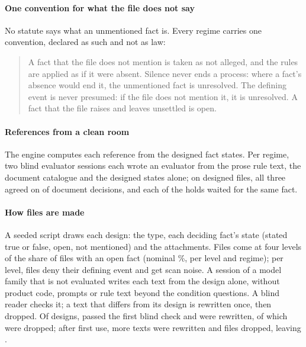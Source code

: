 \paragraph{One convention for what the file does not say}
No statute says what an unmentioned fact is. Every regime carries one convention, declared as such and not as law:
\begin{quote}\footnotesize
A fact that the file does not mention is taken as not alleged, and the rules are applied as if it were absent. Silence never ends a process: where a fact's absence would end it, the unmentioned fact is unresolved. The defining event is never presumed: if the file does not mention it, it is unresolved. A fact that the file raises and leaves unsettled is open.
\end{quote}

\paragraph{References from a clean room}
The engine computes each reference from the designed fact states. Per regime, two blind evaluator sessions each wrote an evaluator from the prose rule text, the document catalogue and the designed states alone; on \sfourdevCleanroomFiles{} designed files, all three agreed on \sfourdevCleanroomSame{} of \sfourdevCleanroomDocuments{} document decisions, and each of the \sfourdevCleanroomHolds{} holds waited for the same fact.

\paragraph{How files are made}
A seeded script draws each design: the type, each deciding fact's state (stated true or false, open, not mentioned) and the attachments. Files come at four levels of the share of files with an open fact (nominal \sfourdevLevels\%, \sfourdevPerLevel{} per level and regime); per level, \sfourdevDeniedPerLevel{} files deny their defining event and \sfourdevNoisePerLevel{} get scan noise. A session of a model family that is not evaluated writes each text from the design alone, without product code, prompts or rule text beyond the condition questions. A blind reader checks it; a text that differs from its design is rewritten once, then dropped. Of \sfourdevAllDesigned{} designs, \sfourdevAllOneKept{} passed the first blind check and \sfourdevAllOneRewrite{} were rewritten, of which \sfourdevAllTwoDiffer{} were dropped; after first use, \sfourdevAllRepairRewritten{} more texts were rewritten and \sfourdevAllDroppedAfterUse{} files dropped, leaving \sfourdevAllFiles.

